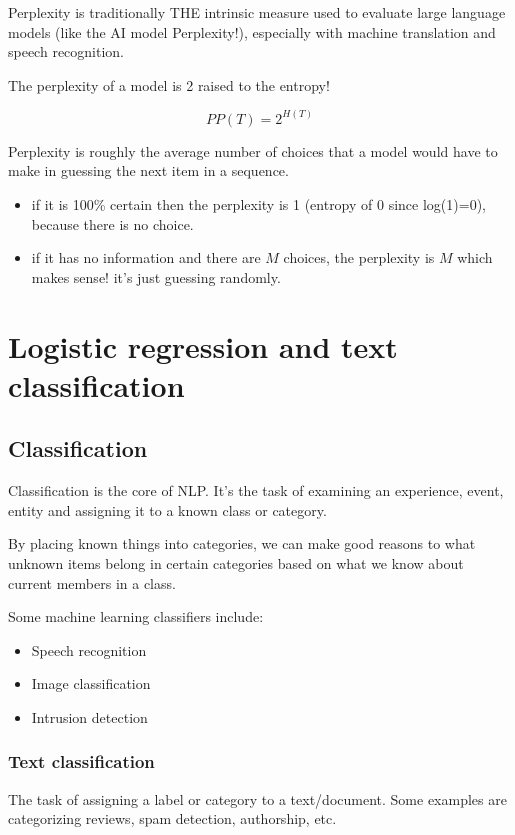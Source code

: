 \documentclass[11pt]{article}
\begin{document}
Perplexity is traditionally THE intrinsic measure used to evaluate large
language models (like the AI model Perplexity!), especially with machine
translation and speech recognition.

The perplexity of a model is 2 raised to the entropy!

\[
	PP(T) = 2^{H(T)}
\]

Perplexity is roughly the average number of choices that a model would have to
make in guessing the next item in a sequence.

\begin{itemize}
	\item if it is 100\% certain then the perplexity is 1 (entropy of 0 since
	      log(1)=0), because there is no choice.
	\item if it has no information and there are $M$ choices, the perplexity is
	      $M$ which makes sense! it's just guessing randomly.
\end{itemize}

\section{Logistic regression and text classification}

\subsection{Classification}

Classification is the core of NLP. It's the task of examining an experience,
event, entity and assigning it to a known class or category.

By placing known things into categories, we can make good reasons to what
unknown items belong in certain categories based on what we know about current
members in a class.

Some machine learning classifiers include:

\begin{itemize}
	\item Speech recognition
	\item Image classification
	\item Intrusion detection
\end{itemize}

\subsubsection{Text classification}

The task of assigning a label or category to a text/document. Some examples are
categorizing reviews, spam detection, authorship, etc.
\end{document}
